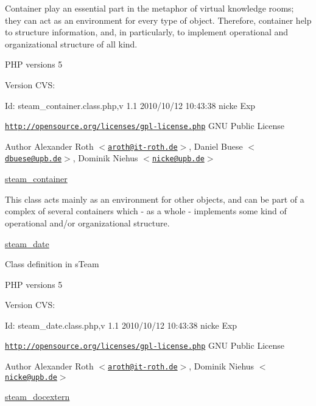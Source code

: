 Container play an essential part in the metaphor of virtual knowledge rooms; they can act as an environment for every type of object. Therefore, container help to structure information, and, in particularly, to implement operational and organizational structure of all kind.

PHP versions 5

\begin{DoxyVersion}{Version}
CVS: 
\end{DoxyVersion}
\begin{DoxyParagraph}{Id:}
steam\_\-container.class.php,v 1.1 2010/10/12 10:43:38 nicke Exp 
\end{DoxyParagraph}


\href{http://opensource.org/licenses/gpl-license.php}{\tt http://opensource.org/licenses/gpl-\/license.php} GNU Public License \begin{DoxyAuthor}{Author}
Alexander Roth $<$\href{mailto:aroth@it-roth.de}{\tt aroth@it-\/roth.de}$>$, Daniel Buese $<$\href{mailto:dbuese@upb.de}{\tt dbuese@upb.de}$>$, Dominik Niehus $<$\href{mailto:nicke@upb.de}{\tt nicke@upb.de}$>$
\end{DoxyAuthor}
\hyperlink{classsteam__container}{steam\_\-container}

This class acts mainly as an environment for other objects, and can be part of a complex of several containers which -\/ as a whole -\/ implements some kind of operational and/or organizational structure.

\hyperlink{classsteam__date}{steam\_\-date}

Class definition in sTeam

PHP versions 5

\begin{DoxyVersion}{Version}
CVS: 
\end{DoxyVersion}
\begin{DoxyParagraph}{Id:}
steam\_\-date.class.php,v 1.1 2010/10/12 10:43:38 nicke Exp 
\end{DoxyParagraph}


\href{http://opensource.org/licenses/gpl-license.php}{\tt http://opensource.org/licenses/gpl-\/license.php} GNU Public License \begin{DoxyAuthor}{Author}
Alexander Roth $<$\href{mailto:aroth@it-roth.de}{\tt aroth@it-\/roth.de}$>$, Dominik Niehus $<$\href{mailto:nicke@upb.de}{\tt nicke@upb.de}$>$
\end{DoxyAuthor}
\hyperlink{classsteam__docextern}{steam\_\-docextern}

